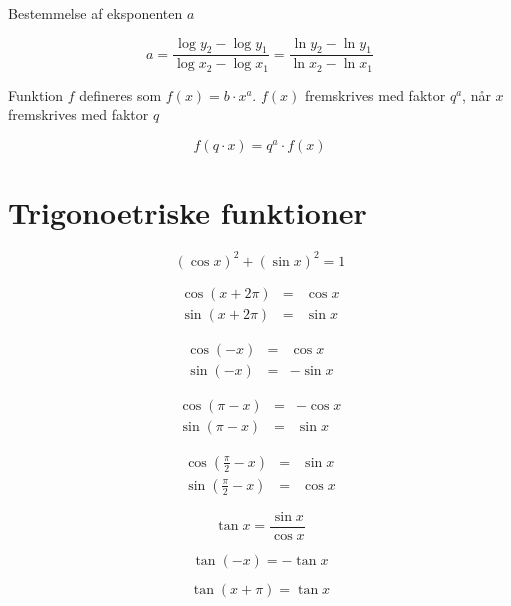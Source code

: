 \documentclass[11pt,a4paper,landscape,twocolumn,fleqn,leqno]{article}
\begin{document}
Bestemmelse af eksponenten $a$

\begin{equation}
a = \frac{\log y_2 - \log y_1}{\log x_2 - \log x_1} = \frac{\ln y_2 - \ln y_1}{\ln x_2 - \ln x_1}
\end{equation}

Funktion $f$ defineres som $f(x) = b \cdot x^a$. $f(x)$ fremskrives med faktor $q^a$, når $x$ fremskrives med faktor $q$

\begin{equation}
f(q \cdot x) = q^a \cdot f(x)
\end{equation}

\vfill

\section{Trigonoetriske funktioner}

\begin{equation}
(\cos x)^2 + (\sin x)^2 = 1
\end{equation}

\begin{eqnarray}
\cos(x + 2\pi) & = & \cos x \\
\sin(x + 2\pi) & = & \sin x \nonumber
\end{eqnarray}

\begin{eqnarray}
\cos(-x) & = & \cos x \\
\sin(-x) & = & - \sin x \nonumber
\end{eqnarray}

\begin{eqnarray}
\cos(\pi - x) & = & - \cos x \\
\sin(\pi - x) & = & \sin x \nonumber
\end{eqnarray}

\begin{eqnarray}
\cos\left(\frac{\pi}{2}-x\right) & = & \sin x \\
\sin\left(\frac{\pi}{2}-x\right) & = & \cos x \nonumber
\end{eqnarray}

\begin{equation}
\tan x = \frac{\sin x}{\cos x}
\end{equation}

\begin{equation}
\tan(-x) = -\tan x
\end{equation}

\begin{equation}
\tan(x+\pi) = \tan x
\end{equation}
\end{document}
